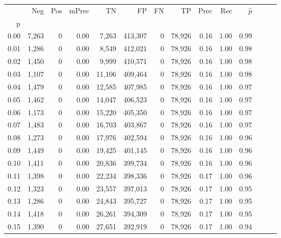 \begin{tabular}{rrrrrrrrrrrrrr}
\toprule
{} &     Neg &    Pos & mPrec &       TN &       FP &      FN &      TP &  Prec &   Rec & $\hat{p}$ \\
p    &         &        &       &          &          &         &         &       &       &           \\
\midrule
0.00 &   7,263 &      0 &  0.00 &    7,263 &  413,307 &       0 &  78,926 &  0.16 &  1.00 &      0.99 \\
0.01 &   1,286 &      0 &  0.00 &    8,549 &  412,021 &       0 &  78,926 &  0.16 &  1.00 &      0.98 \\
0.02 &   1,450 &      0 &  0.00 &    9,999 &  410,571 &       0 &  78,926 &  0.16 &  1.00 &      0.98 \\
0.03 &   1,107 &      0 &  0.00 &   11,106 &  409,464 &       0 &  78,926 &  0.16 &  1.00 &      0.98 \\
0.04 &   1,479 &      0 &  0.00 &   12,585 &  407,985 &       0 &  78,926 &  0.16 &  1.00 &      0.97 \\
0.05 &   1,462 &      0 &  0.00 &   14,047 &  406,523 &       0 &  78,926 &  0.16 &  1.00 &      0.97 \\
0.06 &   1,173 &      0 &  0.00 &   15,220 &  405,350 &       0 &  78,926 &  0.16 &  1.00 &      0.97 \\
0.07 &   1,483 &      0 &  0.00 &   16,703 &  403,867 &       0 &  78,926 &  0.16 &  1.00 &      0.97 \\
0.08 &   1,273 &      0 &  0.00 &   17,976 &  402,594 &       0 &  78,926 &  0.16 &  1.00 &      0.96 \\
0.09 &   1,449 &      0 &  0.00 &   19,425 &  401,145 &       0 &  78,926 &  0.16 &  1.00 &      0.96 \\
0.10 &   1,411 &      0 &  0.00 &   20,836 &  399,734 &       0 &  78,926 &  0.16 &  1.00 &      0.96 \\
0.11 &   1,398 &      0 &  0.00 &   22,234 &  398,336 &       0 &  78,926 &  0.17 &  1.00 &      0.96 \\
0.12 &   1,323 &      0 &  0.00 &   23,557 &  397,013 &       0 &  78,926 &  0.17 &  1.00 &      0.95 \\
0.13 &   1,286 &      0 &  0.00 &   24,843 &  395,727 &       0 &  78,926 &  0.17 &  1.00 &      0.95 \\
0.14 &   1,418 &      0 &  0.00 &   26,261 &  394,309 &       0 &  78,926 &  0.17 &  1.00 &      0.95 \\
0.15 &   1,390 &      0 &  0.00 &   27,651 &  392,919 &       0 &  78,926 &  0.17 &  1.00 &      0.94 \\

\end{tabular}
